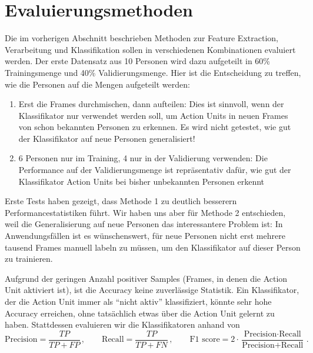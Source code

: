 \section{Evaluierungsmethoden}
Die im vorherigen Abschnitt beschrieben Methoden zur Feature Extraction,
Verarbeitung und Klassifikation sollen in verschiedenen Kombinationen evaluiert
werden. Der erste Datensatz aus 10 Personen wird dazu aufgeteilt in 60\%
Trainingsmenge und 40\% Validierungsmenge. Hier ist die Entscheidung zu treffen,
wie die Personen auf die Mengen aufgeteilt werden:
\begin{enumerate}
\item Erst die Frames durchmischen, dann aufteilen: Dies ist sinnvoll, wenn der
  Klassifikator nur verwendet werden soll, um Action Units in neuen Frames von schon bekannten
  Personen zu erkennen. Es wird nicht getestet, wie gut der Klassifikator auf
  neue Personen generalisiert!
  \item 6 Personen nur im Training, 4 nur in der Validierung verwenden: Die
    Performance auf der Validierungsmenge ist repräsentativ dafür, wie gut der
    Klassifikator Action Units bei bisher unbekannten Personen erkennt
\end{enumerate}
Erste Tests haben gezeigt, dass Methode 1 zu deutlich besserern
Performancestatistiken führt. Wir haben uns aber für Methode 2 entschieden, weil
die Generalisierung auf neue Personen das interessantere Problem ist: In
Anwendungsfällen ist es wünschenswert, für neue Personen nicht erst mehrere
tausend Frames manuell labeln zu müssen, um den Klassifikator auf dieser Person
zu trainieren.

Aufgrund der geringen Anzahl positiver Samples (Frames, in denen die Action Unit
aktiviert ist), ist die Accuracy keine zuverlässige Statistik. Ein Klassifikator,
der die Action Unit immer als ``nicht aktiv'' klassifiziert, könnte sehr hohe
Accuracy erreichen, ohne tatsächlich etwas über die Action Unit gelernt zu haben.
Stattdessen evaluieren wir die Klassifikatoren anhand von
\begin{equation*}
\text{Precision}=\frac{TP}{TP+FP}\,, \qquad \text{Recall}=\frac{TP}{TP+FN}\,, \qquad \text{F1 score}=2\cdot\frac{\text{Precision}\cdot\text{Recall}}{\text{Precision}+\text{Recall}}\,.
\end{equation*}

